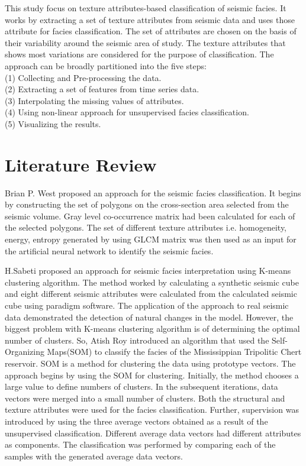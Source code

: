 \documentclass[a4paper]{article}
\begin{document}
This study focus on texture attributes-based classification\cite{7} of seismic facies. It works by extracting a set of texture attributes from seismic data and uses those attribute for facies classification. The set of attributes are chosen on the basis of their variability around the seismic area of study. The texture attributes that shows most variations are considered for the purpose of classification. The approach can be broadly partitioned into the five steps:\\
(1) Collecting and Pre-processing the data.\\
(2) Extracting a set of features from time series data.\\
(3) Interpolating the missing values of attributes.\\
(4) Using non-linear approach for unsupervised facies classification.\\
(5) Visualizing the results. \\

\section{Literature Review}
Brian P. West\cite{8} proposed an approach for the seismic facies classification.  It begins by constructing the set of polygons on the cross-section area selected from the seismic volume. Gray level co-occurrence matrix had been calculated for each of the selected polygons. The set of different texture attributes i.e. homogeneity, energy, entropy generated by using GLCM matrix was then used as an input for the artificial neural network to identify the seismic facies. 

H.Sabeti\cite{sabeti} proposed an approach for seismic facies interpretation using K-means clustering algorithm. The method worked by calculating a synthetic seismic cube and eight different seismic attributes were calculated from the calculated seismic cube using paradigm software. The application of the approach to real seismic data demonstrated the detection of natural changes in the model. However, the biggest problem with K-means clustering algorithm is of determining the optimal number of clusters.
So, Atish Roy\cite{atish} introduced an algorithm that used the Self-Organizing Maps(SOM) to classify the facies of the Mississippian Tripolitic Chert reservoir. SOM\cite{som} is a method for clustering the data using prototype vectors. The approach begins by using the SOM for clustering. Initially, the method chooses a large value to define numbers of clusters. In the subsequent iterations, data vectors were merged into a small number of clusters. Both the structural and texture attributes were used for the facies classification. Further, supervision was introduced by using the three average vectors obtained as a result of the unsupervised classification. Different average data vectors had different attributes as components. The classification was performed by comparing each of the samples with the generated average data vectors. \smallbreak
\end{document}
